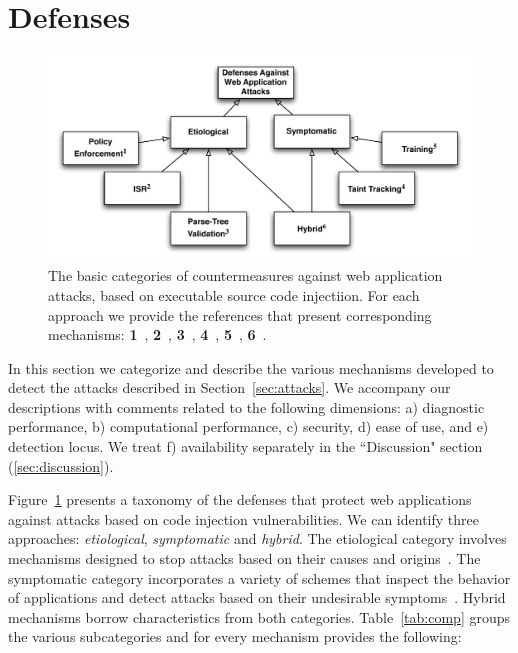 \documentclass[conference]{IEEEtran}
\begin{document}
\section{Defenses}
\label{sec:defs}

\begin{figure} [ht]
\begin{center}
\leavevmode
\includegraphics[scale=0.65]{defenses.pdf}
\end{center}
\caption{\label{fig:defenses}The basic categories of countermeasures
against web application attacks, based on executable source code
injectiion. For each approach we provide the references
that present corresponding mechanisms:
{\bf 1}~\cite{NSS06,JKK06a,KKVJ06,KJKV09,TNH07,RDWDE07,YCIS07,OWVS08,PSC09,ML10,DDHPJ10,PS11,VDDPJ11,BV08,LV09},
{\bf 2}~\cite{BK04,JB07,GC09,APKLM10},
{\bf 3}~\cite{BWS05,SW06},
{\bf 4}~\cite{HCF05,PB05,XBS06,NLC07,VFJKKV07,PMP11,SLMS14},
{\bf 5}~\cite{LLW02,HO05,HO06,HO05b,VMV05,JEP08,WPLKK09,MS09,MKS09,MKLS11},
{\bf 6}~\cite{BV08,LV09,SMS13}.}
\end{figure}

In this section we categorize and describe the various mechanisms
developed to detect the attacks described in
Section~\ref{sec:attacks}. We accompany our descriptions with comments
related to the following dimensions: a) diagnostic performance, b)
computational performance, c) security, d) ease of use, and e)
detection locus. We treat f) availability separately in the
``Discussion" section (\ref{sec:discussion}).

Figure~\ref{fig:defenses} presents a taxonomy of the
defenses that protect web applications against attacks based on
code injection vulnerabilities.
We can identify three approaches:
{\it etiological}, {\it symptomatic} and {\it hybrid}.
The etiological category involves mechanisms designed to
stop attacks based on their causes and origins~\cite{JL75,L81}. 
The symptomatic category incorporates a variety of schemes that
inspect the behavior of applications and detect attacks based on
their undesirable symptoms~\cite{D76,A00}.
Hybrid mechanisms borrow characteristics from both
categories. Table~\ref{tab:comp} groups the various subcategories and
for every mechanism provides the following:
\end{document}
